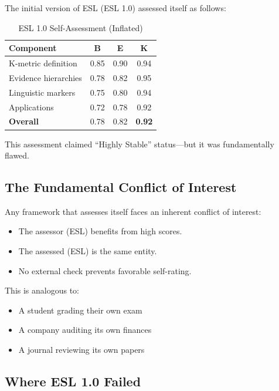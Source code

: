\documentclass[11pt,a4paper]{article}
\theoremstyle{remark}
\begin{document}
The initial version of ESL (ESL 1.0) assessed itself as follows:

\begin{table}[h]
\centering
\caption{ESL 1.0 Self-Assessment (Inflated)}
\label{tab:esl10}
\begin{tabular}{lccc}
\toprule
\textbf{Component} & \textbf{B} & \textbf{E} & \textbf{K} \\
\midrule
K-metric definition & 0.85 & 0.90 & 0.94 \\
Evidence hierarchies & 0.78 & 0.82 & 0.95 \\
Linguistic markers & 0.75 & 0.80 & 0.94 \\
Applications & 0.72 & 0.78 & 0.92 \\
\midrule
\textbf{Overall} & 0.78 & 0.82 & \textbf{0.92} \\
\bottomrule
\end{tabular}
\end{table}

This assessment claimed ``Highly Stable'' status---but it was fundamentally flawed.

\subsection{The Fundamental Conflict of Interest}

\begin{keyinsight}[title={The Self-Assessment Paradox}]
Any framework that assesses itself faces an inherent conflict of interest:
\begin{itemize}
    \item The assessor (ESL) benefits from high scores.
    \item The assessed (ESL) is the same entity.
    \item No external check prevents favorable self-rating.
\end{itemize}

This is analogous to:
\begin{itemize}
    \item A student grading their own exam
    \item A company auditing its own finances
    \item A journal reviewing its own papers
\end{itemize}
\end{keyinsight}

\subsection{Where ESL 1.0 Failed}
\end{document}
